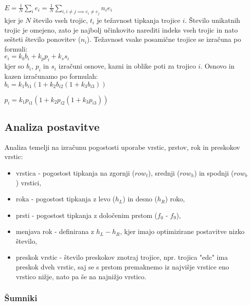     $E = \frac{1}{N} \displaystyle\sum_{i} e_{i} = \frac{1}{N} \displaystyle\sum_{i, i \neq j \implies e_{i} \neq e_{j}} n_{i} e_{i}$ \\

    kjer je $N$ število vseh trojic, $t_{i}$ je težavnost tipkanja trojice $i$.
    Število unikatnih trojic je omejeno, zato je najbolj učinkovito narediti indeks vseh trojic in nato sešteti število ponovitev ($n_{i}$).
    Težavnost vsake posamične trojice se izračuna po formuli: \\

    $e_{i} = k_{b} b_{i} + k_{p} p_{i} + k_{s} s_{i}$ \\

    kjer so $b_{i}$, $p_{i}$ in $s_{i}$ izračuni osnove, kazni in oblike poti za trojico $i$.
    Osnovo in kazen izračunamo po formulah: \\

    $b_{i} = k_{1} b_{i1} (1 + k_{2} b_{i2} (1 + k_{3} b_{i3}))$

    $p_{i} = k_{1} p_{i1} (1 + k_{2} p_{i2} (1 + k_{3} p_{i3}))$

    \subsection{Analiza postavitve}\label{subsec:analiza-postavitve}

    Analiza temelji na izračunu pogostosti uporabe vrstic, prstov, rok in preskokov vrstic:

    \begin{itemize}
        \item vrstica - pogostost tipkanja na zgornji ($row_{t}$), srednji ($row_{h}$) in spodnji ($row_{b}$) vrstici,
        \item roka - pogostost tipkanja z levo ($h_{L}$) in desno ($h_{R}$) roko,
        \item prsti - pogostost tipkanja z določenim prstom ($f_{0}$ - $f_{9}$),
        \item menjava rok - definirana z $h_{L} - h_{R}$, kjer imajo optimizirane postavitve nizko število,
        \item preskok vrstic - število preskokov znotraj trojice, npr. trojica "edc" ima preskok dveh vrstic, saj se s prstom premaknemo iz najvišje vrstice eno vrstico nižje, nato pa še na najnižjo vrstico.
    \end{itemize}

\newpage
    \subsubsection{Šumniki}\label{sumniki}

